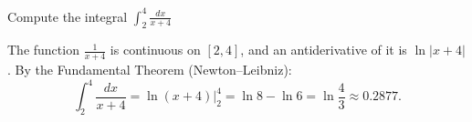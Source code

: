 
\begin{question}
Compute the integral $\displaystyle\int_2^4\frac{dx}{x+4}$
\end{question}

\begin{solution}
The function $\frac{1}{x+4}$ is continuous on $[2,4]$, and an antiderivative of it is $\ln|x+4|$. By the Fundamental Theorem (Newton--Leibniz):
\[ \int_2^4\frac{dx}{x+4}=\ln(x+4)\Big|_2^4=\ln8-\ln6=\boxed{\ln\frac43}\approx 0.2877. \]
\end{solution}
